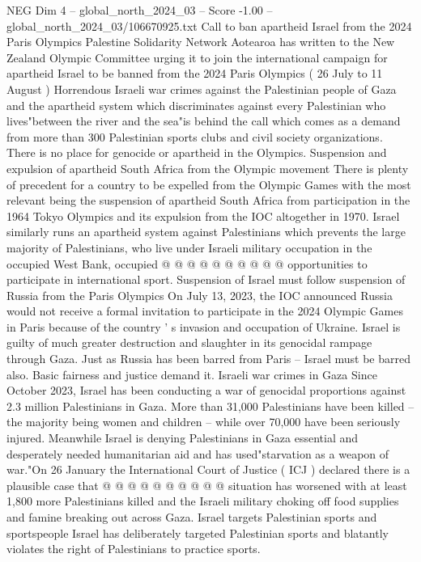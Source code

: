 \begin{textsample}{NEG Dim 4 – global\_north\_2024\_03 – Score -1.00 – global\_north\_2024\_03/106670925.txt}  \label{ex:f4_neg_221}
Call to ban apartheid Israel from the 2024 Paris Olympics Palestine Solidarity Network Aotearoa has written to the New Zealand Olympic Committee urging it to join the international campaign for apartheid Israel to be banned from the 2024 Paris Olympics ( 26 July to 11 August ) Horrendous Israeli war crimes against the Palestinian people of Gaza and the apartheid system which discriminates against every Palestinian who lives"between the river and the sea"is behind the call which comes as a demand from more than 300 Palestinian sports clubs and civil society organizations.
There is no place for genocide or apartheid in the Olympics.
Suspension and expulsion of apartheid South Africa from the Olympic movement There is plenty of precedent for a country to be expelled from the Olympic Games with the most relevant being the suspension of apartheid South Africa from participation in the 1964 Tokyo Olympics and its expulsion from the IOC altogether in 1970.
Israel similarly runs an apartheid system against Palestinians which prevents the large majority of Palestinians, who live under Israeli military occupation in the occupied West Bank, occupied @ @ @ @ @ @ @ @ @ @ opportunities to participate in international sport.
Suspension of Israel must follow suspension of Russia from the Paris Olympics On July 13, 2023, the IOC announced Russia would not receive a formal invitation to participate in the 2024 Olympic Games in Paris because of the country ' s invasion and occupation of Ukraine.
Israel is guilty of much greater destruction and slaughter in its genocidal rampage through Gaza.
Just as Russia has been barred from Paris -- Israel must be barred also.
Basic fairness and justice demand it.
Israeli war crimes in Gaza Since October 2023, Israel has been conducting a war of genocidal proportions against 2.3 million Palestinians in Gaza.
More than 31,000 Palestinians have been killed -- the majority being women and children -- while over 70,000 have been seriously injured.
Meanwhile Israel is denying Palestinians in Gaza essential and desperately needed humanitarian aid and has used"starvation as a weapon of war."On 26 January the International Court of Justice ( ICJ ) declared there is a plausible case that @ @ @ @ @ @ @ @ @ @ situation has worsened with at least 1,800 more Palestinians killed and the Israeli military choking off food supplies and famine breaking out across Gaza.
Israel targets Palestinian sports and sportspeople Israel has deliberately targeted Palestinian sports and blatantly violates the right of Palestinians to practice sports.

\end{textsample}
